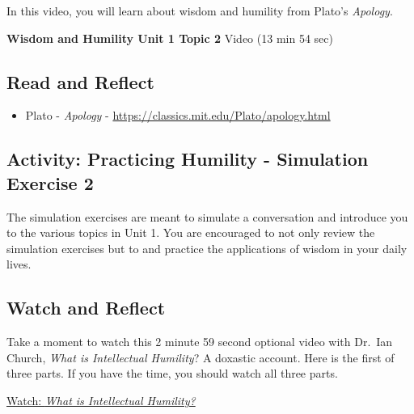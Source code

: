 \documentclass[
]{book}
\providecommand{\tightlist}{%
  \setlength{\itemsep}{0pt}\setlength{\parskip}{0pt}}
\begin{document}
In this video, you will learn about wisdom and humility from Plato's \emph{Apology}.

\textbf{Wisdom and Humility Unit 1 Topic 2} Video (13 min 54 sec)

\hypertarget{read-and-reflect-1}{%
\subsection*{Read and Reflect}\label{read-and-reflect-1}}

\begin{itemize}
\tightlist
\item
  Plato - \emph{Apology} - \url{https://classics.mit.edu/Plato/apology.html}
\end{itemize}

\hypertarget{activity-practicing-humility---simulation-exercise-2}{%
\subsection*{Activity: Practicing Humility - Simulation Exercise 2}\label{activity-practicing-humility---simulation-exercise-2}}

\begin{reflect}
The simulation exercises are meant to simulate a conversation and introduce you to the various topics in Unit 1. You are encouraged to not only review the simulation exercises but to and practice the applications of wisdom in your daily lives.
\end{reflect}

\hypertarget{watch-and-reflect-3}{%
\subsection*{Watch and Reflect}\label{watch-and-reflect-3}}

\begin{reflect}
Take a moment to watch this 2 minute 59 second optional video with Dr.~Ian Church, \emph{What is Intellectual Humility}? A doxastic account. Here is the first of three parts. If you have the time, you should watch all three parts.

\href{https://www.youtube.com/watch?v=8CZIkGEJYRY}{Watch: \emph{What is Intellectual Humility?}}
\end{reflect}
\end{document}
